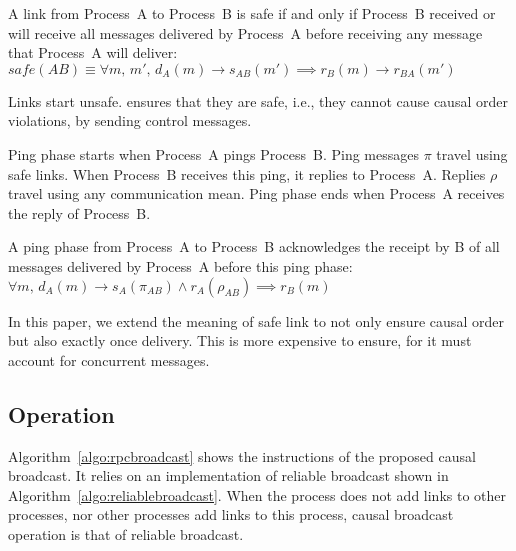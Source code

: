 \begin{definition} 
  A link from Process~A to Process~B is safe if and only if Process~B received
  or will receive all messages delivered by Process~A before receiving any
  message that Process~A will
  deliver: $safe(AB) \equiv \forall m,\, m',\, d_A(m) \rightarrow s_{AB}(m')
  \implies r_B(m) \rightarrow r_{BA}(m')$
\end{definition}

Links start unsafe. \PCBROADCAST ensures that they are safe, i.e., they cannot
cause causal order violations, by sending control messages.

\begin{definition}
  Ping phase starts when Process~A pings Process~B. Ping messages $\pi$ travel
  using safe links. When Process~B receives this ping, it replies to
  Process~A. Replies $\rho$ travel using any communication mean. Ping phase ends
  when Process~A receives the reply of Process~B.
\end{definition}

\begin{lemma}
  A ping phase from Process~A to Process~B acknowledges the receipt by B of all
  messages delivered by Process~A before this ping phase:
  $\forall m,\, d_A(m) \rightarrow s_A(\pi_{AB}) \wedge r_A(\rho_{AB}) \implies
  r_B(m)$
\end{lemma}


In this paper, we extend the meaning of safe link to not only ensure causal
order but also exactly once delivery. This is more expensive to ensure, for it
must account for concurrent messages. 



\subsection{Operation}

Algorithm~\ref{algo:rpcbroadcast} shows the instructions of the proposed causal
broadcast. It relies on an implementation of reliable broadcast shown in
Algorithm~\ref{algo:reliablebroadcast}. When the process does not add links to
other processes, nor other processes add links to this process, causal broadcast
operation is that of reliable broadcast.

